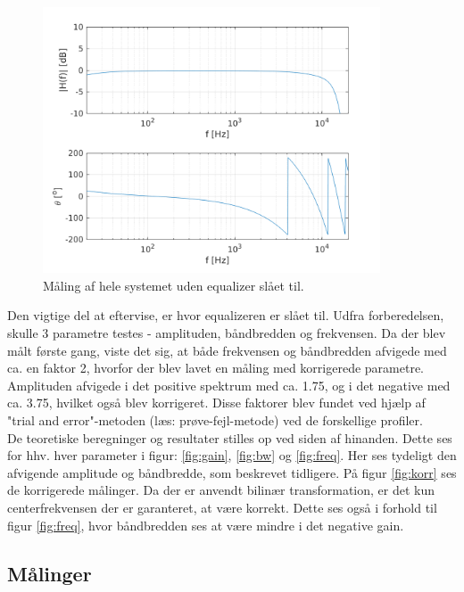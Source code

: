 \begin{figure}[h!]
	\centering
	\includegraphics[width=10cm]{matlabdemo/test/test_eq_off.png}  
	\caption{Måling af hele systemet uden equalizer slået til.}
	\label{fig:eq_off1}
\end{figure}

Den vigtige del at eftervise, er hvor equalizeren er slået til. 
Udfra forberedelsen, skulle 3 parametre testes - amplituden, båndbredden og frekvensen. 
Da der blev målt første gang, viste det sig, at både frekvensen og båndbredden afvigede med ca. en faktor 2, hvorfor der blev lavet en måling med korrigerede parametre. Amplituden afvigede i det positive spektrum med ca. 1.75, og i det negative med ca. 3.75, hvilket også blev korrigeret. Disse faktorer blev fundet ved hjælp af "trial and error"-metoden (læs: prøve-fejl-metode) ved de forskellige profiler. \\
De teoretiske beregninger og resultater stilles op ved siden af hinanden.
Dette ses for hhv. hver parameter i figur: \ref{fig:gain}, \ref{fig:bw} og \ref{fig:freq}. 
Her ses tydeligt den afvigende amplitude og båndbredde, som beskrevet tidligere. På figur \ref{fig:korr} ses de korrigerede målinger.
Da der er anvendt bilinær transformation, er det kun centerfrekvensen der er garanteret, at være korrekt.
Dette ses også i forhold til figur \ref{fig:freq}, hvor båndbredden ses at være mindre i det negative gain. 

\subsection{Målinger}

